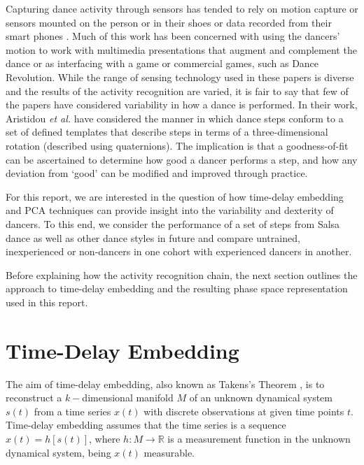 \documentclass[10pt,journal,compsoc]{IEEEtran}
\begin{document}
Capturing dance activity through sensors has tended 
to rely on motion capture \cite{Alexiadis2014} or sensors mounted on the 
person \cite{Lynch2005} or in their shoes \cite{Paradiso1997} or data recorded from their 
smart phones \cite{Wei2014}. Much of this work has been concerned 
with using the dancers' motion to work with multimedia 
presentations that augment and complement the dance \cite{Griffith1998, Park2006}
or as interfacing with a game \cite{Chu2012} or commercial games, 
such as Dance Revolution. While the range of sensing 
technology used in these papers is diverse and the results 
of the activity recognition are varied, it is fair to say that 
few of the papers have considered variability  in how a 
dance is performed. In their work, Aristidou \textit{et al.} \cite{Aristidou2014} have 
considered the manner in which dance steps conform to 
a set of defined templates that describe steps in terms of 
a three-dimensional rotation (described using quaternions).  
The implication is that a goodness-of-fit can be ascertained 
to determine how good a dancer performs a step, and how 
any deviation from ‘good’ can be modified and improved 
through practice. 

For this report, we are interested in the question of how 
time-delay embedding and PCA techniques can provide 
insight into the variability and dexterity of dancers. To this 
end, we consider the performance of a set of steps from Salsa 
dance  as well as other dance styles in future and compare 
untrained, inexperienced or non-dancers in one cohort with 
experienced dancers in another.

Before explaining how the activity recognition chain, the next 
section outlines the approach to time-delay embedding and 
the resulting phase space representation used in this report. 



\section{Time-Delay Embedding}
The aim of time-delay embedding, also known as Takens's 
Theorem \cite{Takens1981}, is to reconstruct a $k-$dimensional manifold $M$ 
of an unknown dynamical system $s(t)$ from a time series 
$x(t)$ with discrete observations at given time points $t$. 
Time-delay embedding assumes that the time series is a sequence 
$x(t)=h[s(t)]$,  where  $h: M \rightarrow \mathbb{R}$ is a measurement function 
in the unknown dynamical system, being $x(t)$ measurable.
\end{document}
